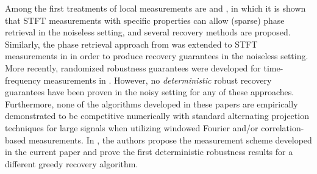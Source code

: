 Among the first treatments of local measurements are \cite{BendoryE16,eldar2014sparse} and \cite{jaganathan2015stft}, in which it is shown that STFT measurements with specific properties can allow (sparse) phase retrieval in the noiseless setting, and several recovery methods are proposed.  Similarly, the phase retrieval approach from \cite{alexeev2014phase} was extended to STFT measurements in \cite{salanevich2015polarization} in order to produce recovery guarantees in the noiseless setting.  More recently, randomized robustness guarantees were developed for time-frequency measurements in \cite{pfander2016robust}.  However, no {\it deterministic} robust recovery guarantees have been proven in the noisy setting for any of these approaches.  Furthermore, none of the algorithms developed in these papers are empirically demonstrated to be competitive numerically with standard alternating projection techniques for large signals when utilizing windowed Fourier and/or correlation-based measurements.  In \cite{IVW2015_FastPhase}, the authors propose the measurement scheme developed in the current paper and prove the first deterministic robustness results for a different greedy recovery algorithm.





